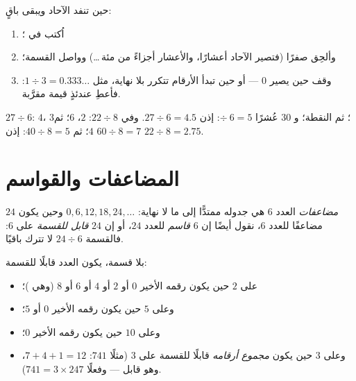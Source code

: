 \begin{method}\label{met:g5:division:continue}
حين تنفد الآحاد ويبقى باقٍ:
\begin{enumerate}
  \item اُكتب  في ؛
  \item وألحِق صفرًا  (فتصير الآحاد أعشارًا، والأعشار
        أجزاءً من مئة\,\dots) وواصل القسمة؛
  \item وقف حين يصير  $0$ --- أو حين تبدأ الأرقام
        تتكرر بلا نهاية، مثل $1 \div 3 = 0.333\dots$: فأعطِ عندئذٍ
        قيمة مقرَّبة.
\end{enumerate}
\end{method}

\begin{example}\label{ex:g5:division:continue}
$27 \div 6$:  $4$،  $3$؛ ثم النقطة؛ و $30$ عُشرًا
$\div\ 6 = 5$: إذن $27 \div 6 = 4.5$. \quad
وفي $22 \div 8$: $2$،  $6$؛ ثم $60 \div 8 = 7$  $4$؛
ثم $40 \div 8 = 5$: إذن $22 \div 8 = 2.75$.
\end{example}

\section{المضاعفات والقواسم}

\begin{definition}\label{def:g5:division:multiple}
\emph{مضاعفات} العدد $6$ هي جدوله ممتدًّا
إلى ما لا نهاية: $0, 6, 12, 18, 24, \dots$ وحين يكون $24$ مضاعفًا للعدد $6$،
نقول أيضًا إن $6$ \emph{قاسم} للعدد $24$،
أو إن $24$ \emph{قابل للقسمة} على $6$: فالقسمة
$24 \div 6$ لا تترك باقيًا.
\end{definition}

\begin{proposition}\label{prop:g5:division:criteria}
بلا قسمة، يكون العدد قابلًا للقسمة:
\begin{itemize}
  \item على $2$ حين يكون رقمه الأخير $0$ أو $2$ أو $4$ أو $6$ أو $8$
        (وهي )؛
  \item وعلى $5$ حين يكون رقمه الأخير $0$ أو $5$؛
  \item وعلى $10$ حين يكون رقمه الأخير $0$؛
  \item وعلى $3$ حين يكون \emph{مجموع أرقامه} قابلًا للقسمة على
        $3$ (مثلًا $741$: $7 + 4 + 1 = 12$، وهو قابل --- وفعلًا
        $741 = 3 \times 247$).
\end{itemize}
\end{proposition}
\admitted

